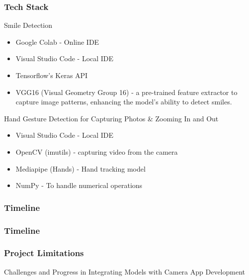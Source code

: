 \documentclass{beamer}
\begin{document}
\begin{frame}
\frametitle{Tech Stack}
\begin{block} {Smile Detection}
\begin{itemize}
    \item Google Colab - Online IDE
    \item Visual Studio Code - Local IDE
    \item Tensorflow's Keras API
    \item VGG16 (Visual Geometry Group 16) - a pre-trained feature extractor to capture image patterns, enhancing the model's ability to detect smiles.
\end{itemize}
    
\end{block}
\begin{block}{Hand Gesture Detection for Capturing Photos \& Zooming In and Out}
\begin{itemize}
    \item Visual Studio Code - Local IDE
    \item OpenCV (imutils) - capturing video from the camera
    \item Mediapipe (Hands) - Hand tracking model
    \item NumPy -  To handle numerical operations 
\end{itemize}
\end{block}
\end{frame}

\begin{frame}
\frametitle{Timeline}
\end{frame}

\begin{frame}
\frametitle{Timeline}
\end{frame}


\begin{frame}
\frametitle{Project Limitations}
\begin{block} {Challenges and Progress in Integrating Models with Camera App Development}
\end{block}
\end{frame}

\end{document}
